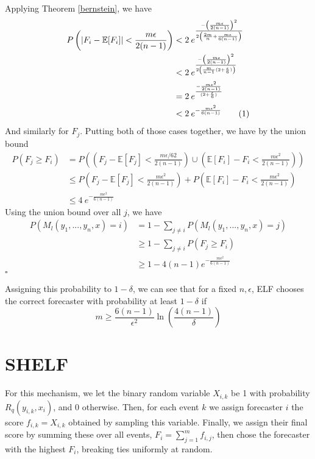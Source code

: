 \documentclass[letterpaper,12pt]{article}
\newcommand{\E}{\mathbb{E}}
\newcommand{\1}{\mathbbm{1}}
\newcommand*{\QED}{\hfill\ensuremath{\square}}%
\newcommand\numberthis{\addtocounter{equation}{1}\tag{\theequation}}
\begin{document}
Applying Theorem \ref{bernstein}, we have
\begin{align*}
    P\left(\left| F_i - \E[F_i]\right| < \frac{m \epsilon}{2(n - 1)} \right) 
    &< 2 \: e^{\frac{-\left(\frac{m \epsilon}{2(n - 1)}\right)^2 }{2\left(\frac{2m}{n} + \frac{m \epsilon}{6(n - 1)}\right)}} \\
    &< 2 \: e^{\frac{-\left(\frac{m \epsilon}{2(n - 1)}\right)^2 }{2\left(\frac{m}{n-1}(2 + \frac{\epsilon}{6}) \right)}} \\
    &= 2 \: e^{\frac{-\frac{m \epsilon^2}{2(n - 1)} }{(2 + \frac{\epsilon}{6})}} \\
    &< 2 \: e^{-\frac{m \epsilon^2}{6(n - 1)} }  \numberthis \label{elf_bernstein} 
\end{align*}
And similarly for $F_j$. Putting both of those cases together, we have by the union bound
\begin{align*}
  P(F_j \geq F_i) &= P\left(\left(F_j - \E[F_j] < \frac{m \epsilon/62}{2(n - 1)}\right) \cup \left(\E[F_i] - F_i < \frac{m \epsilon^2}{2(n - 1)} \right) \right) \\
  &\leq P\left(F_j - \E[F_j] < \frac{m \epsilon^2}{2(n - 1)}\right) + P\left(\E[F_i] - F_i < \frac{m \epsilon^2}{2(n - 1)} \right) \\
  &\leq 4 \: e^{-\frac{m \epsilon^2}{6(n - 1)} }
\end{align*}
Using the union bound over all $j$, we have
\begin{align*}
  P\left(M_l(y_1, ..., y_n, x) = i\right)
  &= 1 - \sum_{j\neq i} P\left(M_l(y_1, ..., y_n, x) = j\right) \\
  &\geq 1 - \sum_{j\neq i} P\left(F_j \geq F_i\right) \\
  &\geq 1 - 4 (n-1) e^{-\frac{m \epsilon^2}{6(n - 1)}} 
\end{align*}
\hfill\QED

Assigning this probability to $1 - \delta$, we can see that for a fixed $n, \epsilon$, ELF chooses the correct forecaster with probability at least $1 - \delta$ if
\[m \geq \frac{6(n-1)}{\epsilon^2}\ln\left(\frac{4(n-1)}{\delta}\right) \]

\section{SHELF}
For this mechanism, we let the binary random variable $X_{i, k}$ be 1 with probability $R_q(y_{i, k}, x_i)$, and 0 otherwise. Then, for each event $k$ we assign forecaster $i$ the score $f_{i, k} = X_{i, k}$ obtained by sampling this variable. Finally, we assign their final score by summing these over all events, $F_i = \sum_{j=1}^m f_{i, j}$, then chose the forecaster with the highest $F_i$, breaking ties uniformly at random. 
\end{document}
